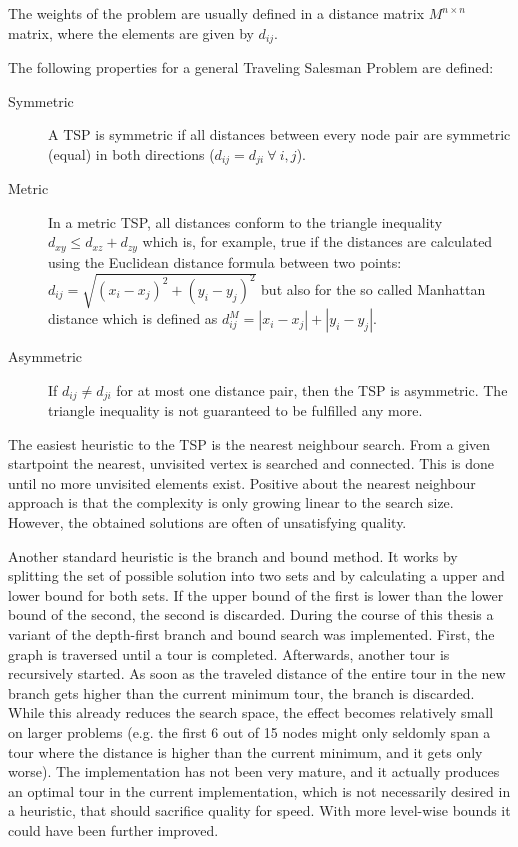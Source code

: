 The weights of the problem are usually defined in a distance matrix  $M^{n \times n}$ matrix, where the elements are given by $d_{ij}$.

The following properties for a general Traveling Salesman Problem are defined:

\begin{description}
\item[Symmetric] A TSP is symmetric if all distances between every node pair are symmetric (equal) in both directions ($d_{ij} = d_{ji} ~ \forall ~ i, j$).
\item[Metric] In a metric TSP, all distances conform to the triangle inequality $d_{xy} \leq d_{xz} + d_{zy} $ which is, for example, true if the distances are calculated using the Euclidean distance formula between two points: $d_{ij} = \sqrt{(x_i -x_j)^2 + (y_i - y_j)^2}$ but also for the so called Manhattan distance which is defined as ${d_{ij}^M} = |x_i-x_j| + |y_i - y_j|$.
\item[Asymmetric] If $d_{ij} \neq d_{ji}$ for at most one distance pair, then the TSP is asymmetric. The triangle inequality is not guaranteed to be fulfilled any more.
\end{description}

The easiest heuristic to the TSP is the nearest neighbour search. From a given startpoint the nearest, unvisited vertex is searched and connected. This is done until no more unvisited elements exist. Positive about the nearest neighbour approach is that the complexity is only growing linear to the search size. However, the obtained solutions are often of unsatisfying quality.

Another standard heuristic is the branch and bound method. It works by splitting the set of possible solution into two sets and by calculating a upper and lower bound for both sets. If the upper bound of the first is lower than the lower bound of the second, the second is discarded. During the course of this thesis a variant of the depth-first branch and bound search was implemented. First, the graph is traversed until a tour is completed. Afterwards, another tour is recursively started. As soon as the traveled distance of the entire tour in the new branch gets higher than the current minimum tour, the branch is discarded. While this already reduces the search space, the effect becomes relatively small on larger problems (e.g. the first 6 out of 15 nodes might only seldomly span a tour where the distance is higher than the current minimum, and it gets only worse). The implementation has not been very mature, and it actually produces an optimal tour in the current implementation, which is not necessarily desired in a heuristic, that should sacrifice quality for speed. With more level-wise bounds it could have been further improved. 

